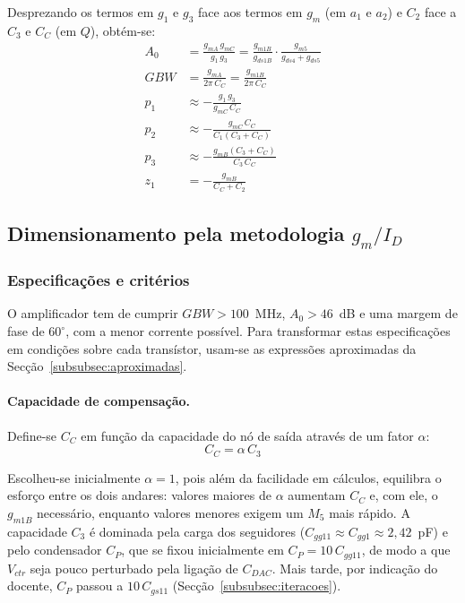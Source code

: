 Desprezando os termos em $g_1$ e $g_3$ face aos termos em $g_m$ (em $a_1$ e $a_2$)
e $C_2$ face a $C_3$ e $C_C$ (em $Q$), obtém-se:
\begin{align}
    A_0 &= \frac{g_{mA}\,g_{mC}}{g_1\,g_3} = \frac{g_{m1B}}{g_{ds1B}}\cdot\frac{g_{m5}}{g_{ds4}+g_{ds5}} \label{eq:A0_aprox}\\
    GBW &= \frac{g_{mA}}{2\pi\,C_C} = \frac{g_{m1B}}{2\pi\,C_C} \label{eq:gbw}\\
    p_1 &\approx -\frac{g_1\,g_3}{g_{mC}\,C_C} \\
    p_2 &\approx -\frac{g_{mC}\,C_C}{C_1\left(C_3 + C_C\right)} \label{eq:p2}\\
    p_3 &\approx -\frac{g_{mB}\left(C_3 + C_C\right)}{C_3\,C_C} \label{eq:p3}\\
    z_1 &= -\frac{g_{mB}}{C_C + C_2}
\end{align}


\subsection{Dimensionamento pela metodologia \texorpdfstring{$g_m/I_D$}{gm/ID}}
\label{subsec:gmid}

\subsubsection{Especificações e critérios}
\label{subsubsec:criterios}

O amplificador tem de cumprir $GBW > 100$~MHz, $A_0 > 46$~dB e uma margem de fase de $60^\circ$,
com a menor corrente possível. Para transformar estas especificações em condições sobre cada
transístor, usam-se as expressões aproximadas da Secção~\ref{subsubsec:aproximadas}.

\paragraph{Capacidade de compensação.} Define-se $C_C$ em função da capacidade do nó de saída
através de um fator $\alpha$:
\begin{equation}
    C_C = \alpha\,C_3
\end{equation}

Escolheu-se inicialmente $\alpha = 1$, pois além da facilidade em cálculos, equilibra o esforço entre os dois andares: valores
maiores de $\alpha$ aumentam $C_C$ e, com ele, o $g_{m1B}$ necessário, enquanto valores menores
exigem um $M_5$ mais rápido. A capacidade $C_3$ é dominada pela carga dos seguidores ($C_{gg11}
\approx C_{gg1} \approx 2{,}42$~pF) e pelo condensador $C_P$, que se fixou inicialmente em
$C_P = 10\,C_{gg11}$, de modo a que $V_{ctr}$ seja pouco perturbado pela ligação de $C_{DAC}$. Mais tarde, por indicação
do docente, $C_P$ passou a $10\,C_{gs11}$ (Secção~\ref{subsubsec:iteracoes}).

